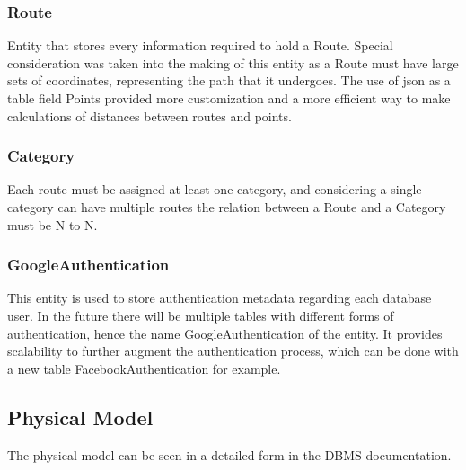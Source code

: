         \subsubsection*{Route}
        Entity that stores every information required to hold a Route. Special consideration was taken into the making
        of this entity as a Route must have large sets of coordinates, representing the path that it undergoes. The 
        use of json as a table field Points provided more customization and a more efficient way to make calculations 
        of distances between routes and points.

        \subsubsection*{Category}
        Each route must be assigned at least one category, and considering a single category can have multiple routes
        the relation between a Route and a Category must be N to N.

        \subsubsection*{GoogleAuthentication}
        This entity is used to store authentication metadata regarding each database user. In the future there
        will be multiple tables with different forms of authentication, hence the name GoogleAuthentication 
        of the entity. It provides scalability to further augment the authentication process, which can be done
        with a new table FacebookAuthentication for example.

    \subsection*{Physical Model}
    The physical model can be seen in a detailed form in the DBMS documentation.\cite{servicedbms}
